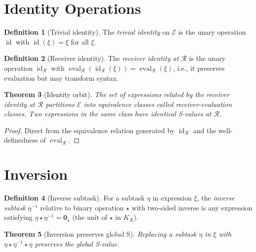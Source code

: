 \documentclass[twocolumn,11pt,a4paper]{article}
\theoremstyle{thmstyle}
\newtheorem{theorem}{Theorem}[section]
\theoremstyle{thmstyle}
\theoremstyle{definition}
\newtheorem{definition}[theorem]{Definition}
\theoremstyle{remark}
\DeclareMathOperator{\id}{id}
\DeclareMathOperator{\eval}{eval}
\newcommand{\Expr}{\mathcal{E}}
\newcommand{\receiver}{\mathcal{R}}
\begin{document}
\section{Identity Operations}
\label{sec:identity-ops}

\begin{definition}[Trivial identity]\label{def:triv-id}
The \emph{trivial identity} on $\Expr$ is the unary
operation $\id$ with $\id(\xi) = \xi$ for all
$\xi$.
\end{definition}

\begin{definition}[Receiver identity]\label{def:rec-id}
The \emph{receiver identity at $\receiver$} is the
unary operation $\id_{\receiver}$ with
$\eval_{\receiver}(\id_{\receiver}(\xi)) =
\eval_{\receiver}(\xi)$, i.e., it preserves
evaluation but may transform syntax.
\end{definition}

\begin{theorem}[Identity orbit]\label{thm:id-orbit}
The set of expressions related by the receiver
identity at $\receiver$ partitions $\Expr$ into
equivalence classes called
\emph{receiver-evaluation classes}.  Two expressions
in the same class have identical S-values at
$\receiver$.
\end{theorem}

\begin{proof}
Direct from the equivalence relation generated by
$\id_{\receiver}$ and the well-definedness of
$\eval_{\receiver}$.
\end{proof}

\section{Inversion}
\label{sec:inversion}

\begin{definition}[Inverse subtask]\label{def:inv-sub}
For a subtask $\eta$ in expression $\xi$, the
\emph{inverse subtask} $\eta^{-1}$ relative to
binary operation $\star$ with two-sided inverse
is any expression satisfying
$\eta \star \eta^{-1} = \mathbf{0}_{\star}$
(the unit of $\star$ in $K_{\receiver}$).
\end{definition}

\begin{theorem}[Inversion preserves global S]
\label{thm:inv-preserves-global}
Replacing a subtask $\eta$ in $\xi$ with
$\eta \star \eta^{-1} \star \eta$ preserves the
global S-value.
\end{theorem}
\end{document}
